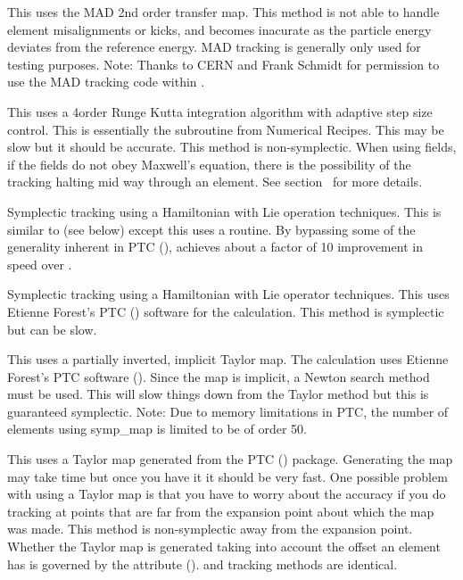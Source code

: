 \begin{description}
\item[\vn{MAD}]
This uses the MAD 2nd order transfer map. This method is not able to
handle element misalignments or kicks, and becomes inacurate as the
particle energy deviates from the reference energy. MAD tracking is
generally only used for testing purposes. Note: Thanks to CERN and
Frank Schmidt for permission to use the MAD tracking code within
\bmad.

\item[\vn{runge_kutta}]
This uses a 4\Th order Runge Kutta integration algorithm with adaptive
step size control.  This is essentially the  subroutine
from Numerical Recipes\cite{b:nr}. This may be slow but it should be
accurate. This method is non-symplectic.  When using
 fields, if the fields do not obey Maxwell's equation,
there is the possibility of the  tracking halting mid
way through an element. See section~ for more details.

\item[\vn{Symp_Lie_Bmad}]
Symplectic tracking using a Hamiltonian with Lie operation techniques.
This is similar to  (see below) except this uses a
\bmad routine. By bypassing some of the generality inherent in PTC
(),  achieves about a factor of 10
improvement in speed over .

\item[\vn{Symp_Lie_PTC}]
Symplectic tracking using a Hamiltonian with Lie operator techniques.
This uses Etienne Forest's PTC () software for the
calculation. This method is symplectic but can be slow.

\item[\vn{Symp_Map}]
This uses a partially inverted, implicit Taylor map. The calculation
uses Etienne Forest's PTC software ().  Since the
map is implicit, a Newton search method must be used. This will slow
things down from the Taylor method but this is guaranteed
symplectic. Note: Due to memory limitations in PTC, the number of
elements using symp_map is limited to be of order 50.

\item[\vn{Taylor}]
This uses a Taylor map generated from the PTC ()
package. Generating the map may take time but once you have it it
should be very fast. One possible problem with using a Taylor map is
that you have to worry about the accuracy if you do tracking at points
that are far from the expansion point about which the map was
made. This method is non-symplectic away from the expansion
point. Whether the Taylor map is generated taking into account the
offset an element has is governed by the 
attribute ().  and 
tracking methods are identical. 


\end{description}
